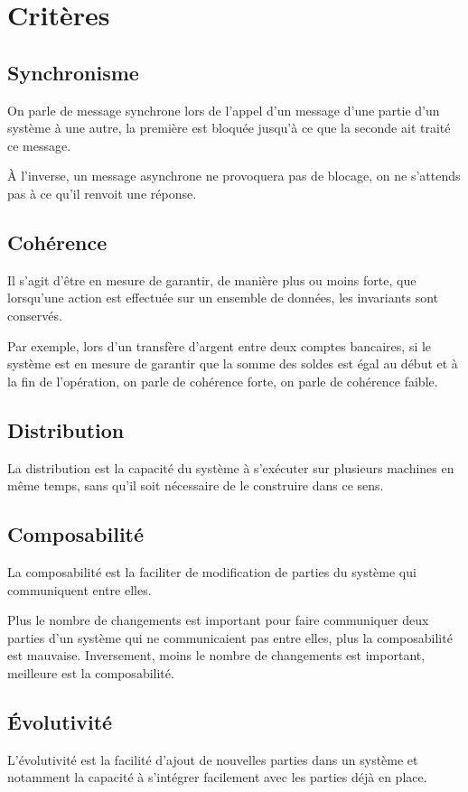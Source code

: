 \documentclass{article}
\begin{document}
\section{Critères}\label{criteres}
\subsection{Synchronisme}
On parle de message synchrone lors de l'appel d'un message d'une partie d'un système
à une autre, la première est bloquée jusqu'à ce que la seconde ait traité ce message.

À l'inverse, un message asynchrone ne provoquera pas de blocage, on ne s'attends pas
à ce qu'il renvoit une réponse.

\subsection{Cohérence}
Il s'agit d'être en mesure de garantir, de manière plus ou moins forte, que lorsqu'une
action est effectuée sur un ensemble de données, les invariants sont conservés.

Par exemple, lors d'un transfère d'argent entre deux comptes bancaires, si le système
est en mesure de garantir que la somme des soldes est égal au début et à la fin
de l'opération, on parle de cohérence forte, on parle de cohérence faible.

\subsection{Distribution}
La distribution est la capacité du système à s'exécuter sur plusieurs machines en
même temps, sans qu'il soit nécessaire de le construire dans ce sens.

\subsection{Composabilité}
La composabilité est la faciliter de modification de parties du système qui
communiquent entre elles.

Plus le nombre de changements est important pour faire communiquer deux parties
d'un système qui ne communicaient pas entre elles, plus la composabilité est mauvaise.
Inversement, moins le nombre de changements est important, meilleure est la composabilité.

\subsection{Évolutivité}
L'évolutivité est la facilité d'ajout de nouvelles parties dans un système et notamment
la capacité à s'intégrer facilement avec les parties déjà en place.
\end{document}
